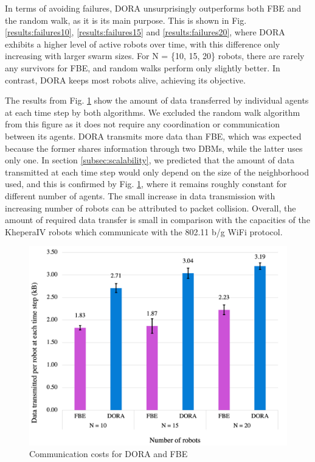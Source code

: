 \documentclass[letterpaper, 10 pt, conference]{ieeeconf}
\begin{document}
In terms of avoiding failures, DORA unsurprisingly outperforms both
FBE and the random walk, as it is its main purpose. This is shown in
Fig. \ref{results:failures10}, \ref{results:failures15} and
\ref{results:failures20}, where DORA exhibits a higher level of active
robots over time, with this difference only increasing with larger
swarm sizes. For N = \{10, 15, 20\} robots, there are rarely any
survivors for FBE, and random walks perform only slightly better. In
contrast, DORA keeps most robots alive, achieving its objective.

The results from Fig. \ref{results:communicationCosts} show the amount
of data transferred by individual agents at each time step by both
algorithms. We excluded the random walk algorithm from this figure as
it does not require any coordination or communication between its
agents. DORA transmits more data than FBE, which was expected because
the former shares information through two DBMs, while the latter uses
only one. In section \ref{subsec:scalability}, we predicted that the
amount of data transmitted at each time step would only depend on the
size of the neighborhood used, and this is confirmed by
Fig. \ref{results:communicationCosts}, where it remains roughly
constant for different number of agents. The small increase in data
transmission with increasing number of robots can be attributed to
packet collision. Overall, the amount of required data transfer is
small in comparison with the capacities of the KheperaIV robots which
communicate with the 802.11 b/g WiFi protocol.

\begin{figure}[h]
    \centering
    \includegraphics[width=0.95\columnwidth]{images/communication.png}
    \caption{Communication costs for DORA and FBE}
    \label{results:communicationCosts}
\end{figure}
\end{document}
